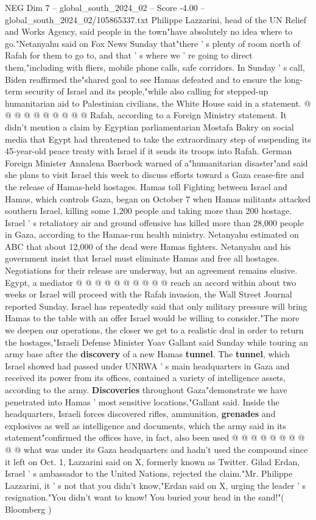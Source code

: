 \begin{textsample}{NEG Dim 7 – global\_south\_2024\_02 – Score -4.00 – global\_south\_2024\_02/105865337.txt}
Philippe Lazzarini, head of the UN Relief and Works Agency, said people in the town"have absolutely no idea where to go."Netanyahu said on Fox News Sunday that"there ' s plenty of room north of Rafah for them to go to, and that ' s where we ' re going to direct them,"including with fliers, mobile phone calls, safe corridors.
In Sunday ' s call, Biden reaffirmed the"shared goal to see Hamas defeated and to ensure the long-term security of Israel and its people,"while also calling for stepped-up humanitarian aid to Palestinian civilians, the White House said in a statement. @ @ @ @ @ @ @ @ @ @ Rafah, according to a Foreign Ministry statement.
It didn't mention a claim by Egyptian parliamentarian Mostafa Bakry on social media that Egypt had threatened to take the extraordinary step of suspending its 45-year-old peace treaty with Israel if it sends its troops into Rafah.
German Foreign Minister Annalena Baerbock warned of a"humanitarian disaster"and said she plans to visit Israel this week to discuss efforts toward a Gaza cease-fire and the release of Hamas-held hostages.
Hamas toll Fighting between Israel and Hamas, which controls Gaza, began on October 7 when Hamas militants attacked southern Israel, killing some 1,200 people and taking more than 200 hostage.
Israel ' s retaliatory air and ground offensive has killed more than 28,000 people in Gaza, according to the Hamas-run health ministry.
Netanyahu estimated on ABC that about 12,000 of the dead were Hamas fighters.
Netanyahu and his government insist that Israel must eliminate Hamas and free all hostages.
Negotiations for their release are underway, but an agreement remains elusive.
Egypt, a mediator @ @ @ @ @ @ @ @ @ @ reach an accord within about two weeks or Israel will proceed with the Rafah invasion, the Wall Street Journal reported Sunday.
Israel has repeatedly said that only military pressure will bring Hamas to the table with an offer Israel would be willing to consider."The more we deepen our operations, the closer we get to a realistic deal in order to return the hostages,"Israeli Defense Minister Yoav Gallant said Sunday while touring an army base after the \textbf{discovery} of a new Hamas \textbf{tunnel}.
The \textbf{tunnel}, which Israel showed had passed under UNRWA ' s main headquarters in Gaza and received its power from its offices, contained a variety of intelligence assets, according to the army. \textbf{Discoveries} throughout Gaza"demonstrate we have penetrated into Hamas ' most sensitive locations,"Gallant said.
Inside the headquarters, Israeli forces discovered rifles, ammunition, \textbf{grenades} and explosives as well as intelligence and documents, which the army said in its statement"confirmed the offices have, in fact, also been used @ @ @ @ @ @ @ @ @ @ what was under its Gaza headquarters and hadn't used the compound since it left on Oct. 1, Lazzarini said on X, formerly known as Twitter.
Gilad Erdan, Israel ' s ambassador to the United Nations, rejected the claim."Mr.
Philippe Lazzarini, it ' s not that you didn't know,"Erdan said on X, urging the leader ' s resignation."You didn't want to know!
You buried your head in the sand!"( Bloomberg )

\end{textsample}

